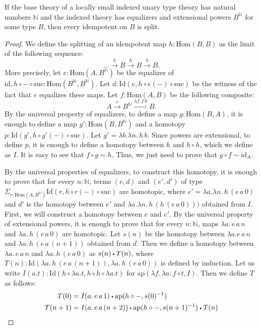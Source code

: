 \documentclass[reqno]{mscs}
\newcommand{\fs}[1]{\mathrm{#1}}
\newcommand{\Hom}{\fs{Hom}}
\newcommand{\Id}{\fs{Id}}
\newcommand{\sym}[1]{#1^{-1}}
\newcommand{\id}{\fs{id}}
\newcommand{\pmap}{\fs{ap}}
\numberwithin{figure}{section}
\newcommand{\ct}{%
  \mathchoice{\mathbin{\raisebox{0.25ex}{$\displaystyle\centerdot$}}}%
             {\mathbin{\raisebox{0.25ex}{$\centerdot$}}}%
             {\mathbin{\raisebox{0.25ex}{$\scriptstyle\,\centerdot\,$}}}%
             {\mathbin{\raisebox{0.25ex}{$\scriptscriptstyle\,\centerdot\,$}}}
}
\begin{document}
\begin{prop}
If the base theory of a locally small indexed unary type theory has natural numbers $\mathbb{N}$ and the indexed theory has equalizers and extensional powers $B^\mathbb{N}$ for some type $B$, then every idempotent on $B$ is split.
\end{prop}
\begin{proof}
We define the splitting of an idempotent map $h : \Hom(B,B)$ as the limit of the following sequence:
\[ \ldots \xrightarrow{h} B \xrightarrow{h} B \xrightarrow{h} B. \]
More precisely, let $e : \Hom(A,B^\mathbb{N})$ be the equalizer of $\id, h \circ - \circ \mathrm{suc} : \Hom(B^\mathbb{N},B^\mathbb{N})$.
Let $d : \Id(e, h \circ e(-) \circ \mathrm{suc})$ be the witness of the fact that $e$ equalizes these maps.
Let $f : \Hom(A,B)$ be the following composite:
\[ A \xrightarrow{e} B^\mathbb{N} \xrightarrow{\lambda f.\,f\,0} B. \]
By the universal property of equalizers, to define a map $g : \Hom(B,A)$, it is enough to define a map $g' : \Hom(B,B^\mathbb{N})$ and a homotopy $p : \Id(g', h \circ g'(-) \circ \mathrm{suc})$.
Let $g' = \lambda b. \lambda n.\,h\,b$.
Since powers are extensional, to define $p$, it is enough to define a homotopy between $h$ and $h \circ h$, which we define as $I$.
It is easy to see that $f \circ g \sim h$.
Thus, we just need to prove that $g \circ f \sim \id_A$.

By the universal properties of equalizers, to construct this homotopy, it is enough to prove that for every $n : \mathbb{N}$, terms $(e,d)$ and $(e',d')$ of type $\Sigma_{r : \Hom(A,B^\mathbb{N})} \Id(r, h \circ r(-) \circ \mathrm{suc})$ are homotopic,
where $e' = \lambda a. \lambda n.\,h\,(e\,a\,0)$ and $d'$ is the homotopy between $e'$ and $\lambda a. \lambda n.\,h\,(h\,(e\,a\,0)))$ obtained from $I$.
First, we will construct a homotopy between $e$ and $e'$.
By the universal property of extensional powers, it is enough to prove that for every $n : \mathbb{N}$, maps $\lambda a.\,e\,a\,n$ and $\lambda a.\,h\,(e\,a\,0)$ are homotopic.
Let $s(n)$ be the homotopy between $\lambda a.e\,a\,n$ and $\lambda a.\,h\,(e\,a\,(n+1))$ obtained from $d$.
Then we define a homotopy between $\lambda a.\,e\,a\,n$ and $\lambda a.\,h\,(e\,a\,0)$ as $s(n) \ct T(n)$, where $T(n) : \Id(\lambda a.\,h\,(e\,a\,(n+1)), \lambda a.\,h\,(e\,a\,0))$ is defined by induction.
Let us write $I(a.t) : \Id(h \circ \lambda a.t, h \circ h \circ \lambda a.t)$ for $\pmap(\lambda f.\,\lambda a.\,f \circ t, I)$.
Then we define $T$ as follows:
\begin{align*}
T(0) & = I(a.\,e\,a\,1) \ct \pmap(h \circ -, \sym{s(0)}) \\
T(n+1) & = I(a.\,e\,a\,(n+2)) \ct \pmap(h \circ -, \sym{s(n+1)}) \ct T(n)
\end{align*}


\end{proof}
\end{document}
